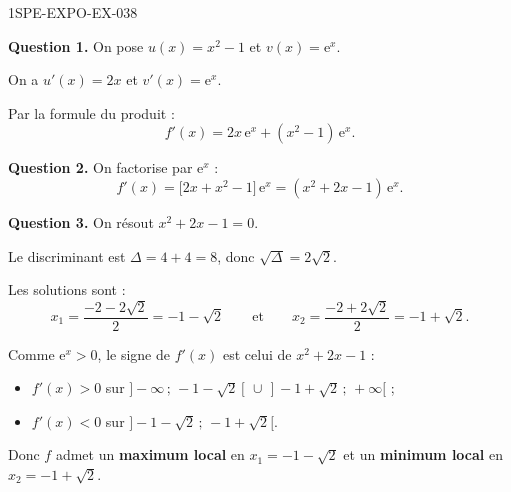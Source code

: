 \begin{corrige}{1SPE-EXPO-EX-038}

\textbf{Question 1.} On pose $u(x) = x^2 - 1$ et $v(x) = \mathrm{e}^{x}$.

On a $u'(x) = 2x$ et $v'(x) = \mathrm{e}^{x}$.

Par la formule du produit :
\[f'(x) = 2x\,\mathrm{e}^{x} + (x^2-1)\,\mathrm{e}^{x}.\]

\textbf{Question 2.} On factorise par $\mathrm{e}^{x}$ :
\[f'(x) = \bigl[2x + x^2 - 1\bigr]\,\mathrm{e}^{x} = \boxed{(x^2+2x-1)\,\mathrm{e}^{x}}.\]

\textbf{Question 3.} On résout $x^2 + 2x - 1 = 0$.

Le discriminant est $\Delta = 4 + 4 = 8$, donc $\sqrt{\Delta} = 2\sqrt{2}$.

Les solutions sont :
\[x_1 = \frac{-2 - 2\sqrt{2}}{2} = -1 - \sqrt{2} \qquad \text{et} \qquad x_2 = \frac{-2 + 2\sqrt{2}}{2} = -1 + \sqrt{2}.\]

Comme $\mathrm{e}^{x} > 0$, le signe de $f'(x)$ est celui de $x^2 + 2x - 1$ :
\begin{itemize}
\item $f'(x) > 0$ sur $]-\infty\,;\,-1-\sqrt{2}[\,\cup\,]-1+\sqrt{2}\,;\,+\infty[$ ;
\item $f'(x) < 0$ sur $]-1-\sqrt{2}\,;\,-1+\sqrt{2}[$.
\end{itemize}

Donc $f$ admet un \textbf{maximum local} en $x_1 = -1 - \sqrt{2}$ et un \textbf{minimum local} en $x_2 = -1 + \sqrt{2}$.
\end{corrige}
